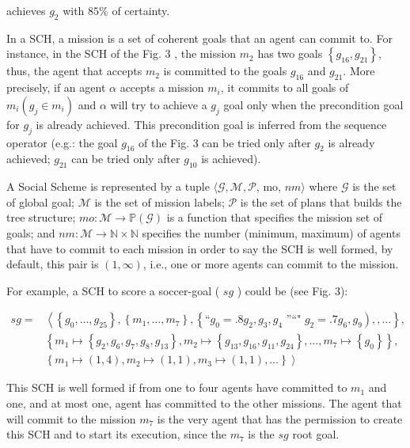 \documentclass[10pt]{article}
\begin{document}
achieves $g_{2}$ with $85 \%$ of certainty.

In a SCH, a mission is a set of coherent goals that an agent can commit to. For instance, in the SCH of the Fig. 3 , the mission $m_{2}$ has two goals $\left\{g_{16}, g_{21}\right\}$, thus, the agent that accepts $m_{2}$ is committed to the goals $g_{16}$ and $g_{21}$. More precisely, if an agent $\alpha$ accepts a mission $m_{i}$, it commits to all goals of $m_{i}\left(g_{j} \in m_{i}\right)$ and $\alpha$ will try to achieve a $g_{j}$ goal only when the precondition goal for $g_{j}$ is already achieved. This precondition goal is inferred from the sequence operator (e.g.: the goal $g_{16}$ of the Fig. 3 can be tried only after $g_{2}$ is already achieved; $g_{21}$ can be tried only after $g_{10}$ is achieved).

A Social Scheme is represented by a tuple $\langle\mathcal{G}, \mathcal{M}, \mathcal{P}$, mo, $n m\rangle$ where $\mathcal{G}$ is the set of global goal; $\mathcal{M}$ is the set of mission labels; $\mathcal{P}$ is the set of plans that builds the tree structure; $m o: \mathcal{M} \rightarrow \mathbb{P}(\mathcal{G})$ is a function that specifies the mission set of goals; and $n m: \mathcal{M} \rightarrow \mathbb{N} \times \mathbb{N}$ specifies the number (minimum, maximum) of agents that have to commit to each mission in order to say the SCH is well formed, by default, this pair is $(1, \infty)$, i.e., one or more agents can commit to the mission.

For example, a SCH to score a soccer-goal ( $s g$ ) could be (see Fig. 3):

$$
\begin{aligned}
s g= & \left\langle\left\{g_{0}, \ldots, g_{25}\right\},\left\{m_{1}, \ldots, m_{7}\right\},\left\{“ g_{0}=.8 g_{2}, g_{3}, g_{4} \text { ”“" } g_{2}=.7 g_{6}, g_{9}\right),, \ldots\right\}, \\
& \left\{m_{1} \mapsto\left\{g_{2}, g_{6}, g_{7}, g_{8}, g_{13}\right\}, m_{2} \mapsto\left\{g_{13}, g_{16}, g_{11}, g_{24}\right\}, \ldots, m_{7} \mapsto\left\{g_{0}\right\}\right\}, \\
& \left.\left\{m_{1} \mapsto(1,4), m_{2} \mapsto(1,1), m_{3} \mapsto(1,1), \ldots\right\}\right\rangle
\end{aligned}
$$

This SCH is well formed if from one to four agents have committed to $m_{1}$ and one, and at most one, agent has committed to the other missions. The agent that will commit to the mission $m_{7}$ is the very agent that has the permission to create this SCH and to start its execution, since the $m_{7}$ is the $s g$ root goal.
\end{document}
